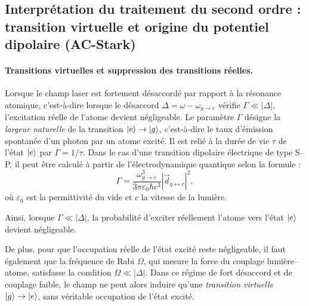 
\subsection{Interprétation du traitement du second ordre : transition virtuelle et origine du potentiel dipolaire (AC-Stark)}

\paragraph{Transitions virtuelles et suppression des transitions réelles.}
Lorsque le champ laser est fortement désaccordé par rapport à la résonance atomique, c’est-à-dire lorsque le désaccord 
\(\Delta = \omega - \omega_{\scriptscriptstyle g\rightarrow e}\) vérifie \( \Gamma \ll |\Delta|  \), 
l’excitation réelle de l’atome devient négligeable. 
Le paramètre \(\Gamma\) désigne la \emph{largeur naturelle} de la transition \(\ket{e} \rightarrow \ket{g}\), 
c’est-à-dire le taux d’émission spontanée d’un photon par un atome excité. 
Il est relié à la durée de vie \(\tau\) de l’état \(\ket{e}\) par \(\Gamma = 1/\tau\). 
Dans le cas d’une transition dipolaire électrique de type S–P, il peut être calculé à partir de l’électrodynamique quantique selon la formule \cite{grimm1999opticaldipoletrapsneutral} :
\begin{equation}
	\Gamma = \frac{\omega_{\scriptscriptstyle g\rightarrow e}^3}{3 \pi \varepsilon_0 \hbar c^3} 
	| \vec{d}_{\scriptscriptstyle g \leftrightarrow e} |^2, \label{chap7:eq.Gamma.1}
\end{equation}
où \(\varepsilon_0\) est la permittivité du vide et \(c\) la vitesse de la lumière. 

\medskip

Ainsi, lorsque \(\Gamma \ll |\Delta| \), la probabilité d’exciter réellement l’atome vers l’état \(\ket{e}\) devient négligeable.

\medskip

De plus, pour que l’occupation réelle de l’état excité reste négligeable, 
il faut également que la fréquence de Rabi \(\Omega\), qui mesure la force du couplage lumière–atome, 
satisfasse la condition
\(
	\Omega \ll |\Delta|.
\)
Dans ce régime de fort désaccord et de couplage faible, 
le champ ne peut alors induire qu’une \emph{transition virtuelle} \(\ket{g} \to \ket{e}\), sans véritable occupation de l’état excité.


